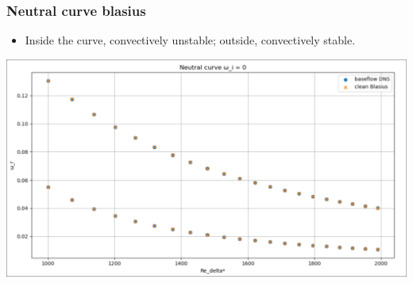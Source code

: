 \documentclass[
  aspectratio=169, %
  t, %
  onlytextwidth, %
  10pt, %
]{beamer}
\begin{document}
\begin{frame}
  \frametitle{Neutral curve blasius}
  \begin{itemize}
    \item Inside the curve, convectively unstable; outside, convectively stable.
  \end{itemize}
  
  \centering
	\includegraphics[width=0.75\linewidth]{Images/neutralcurve.png}
\end{frame}
\end{document}
